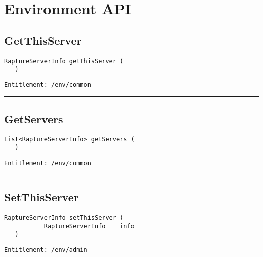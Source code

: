 \chapter{Environment API}

\section{GetThisServer}
\label{Api:GetThisServer}
\begin{lstlisting}[style=nonumbers]
   RaptureServerInfo getThisServer (
   )
\end{lstlisting}
\begin{Verbatim}[formatcom=\color{Maroon}]
  Entitlement: /env/common
\end{Verbatim}



\rule{12cm}{2pt}
\section{GetServers}
\label{Api:GetServers}
\begin{lstlisting}[style=nonumbers]
   List<RaptureServerInfo> getServers (
   )
\end{lstlisting}
\begin{Verbatim}[formatcom=\color{Maroon}]
  Entitlement: /env/common
\end{Verbatim}



\rule{12cm}{2pt}
\section{SetThisServer}
\label{Api:SetThisServer}
\begin{lstlisting}[style=nonumbers]
   RaptureServerInfo setThisServer (
           RaptureServerInfo    info
   )
\end{lstlisting}
\begin{Verbatim}[formatcom=\color{Maroon}]
  Entitlement: /env/admin
\end{Verbatim}



